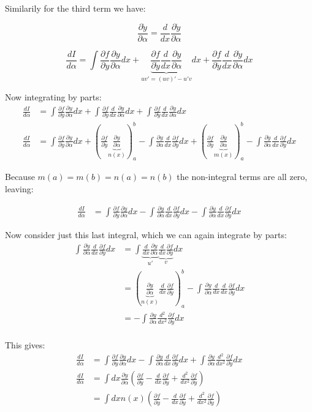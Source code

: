 \documentclass{article}      %
\newcommand{\ydot}[0]{\dot{y}}
\newcommand{\yddot}[0]{\ddot{y}}
\newcommand{\PD}[2]{\frac{\partial {#2}}{\partial {#1}}}
\begin{document}
Similarily for the third term we have:

\begin{equation*}
\PD{\alpha}{\ydot} = \frac{d}{ d x} \PD{\alpha}{\ydot}
\end{equation*}

\begin{equation*}
\frac{dI}{d\alpha} = 
\int \PD{y}{f} \PD{\alpha}{y} d x +
\underbrace{\PD{\ydot}{f} \frac{d}{ d x} \PD{\alpha}{y}}_{ u v' = (u v)' - u' v } d x
+\PD{\yddot}{f} \frac{d}{ d x} \PD{\alpha}{\ydot} d x
\end{equation*}

Now integrating by parts:
\begin{align*}
\frac{dI}{d\alpha} &= 
 \int \PD{y}{f} \PD{\alpha}{y} d x
+\int \PD{\ydot}{f} \frac{d}{ d x} \PD{\alpha}{y} d x
+\int \PD{\yddot}{f} \frac{d}{ d x} \PD{\alpha}{\ydot} d x \\
\frac{dI}{d\alpha} &= 
 \int \PD{y}{f} \PD{\alpha}{y} d x
+\left(\PD{\ydot}{f} \underbrace{\PD{\alpha}{y}}_{n(x)}\right)_a^b - \int \PD{\alpha}{y} \frac{d}{ d x} \PD{\ydot}{f} d x
+\left(\PD{\yddot}{f} \underbrace{\PD{\alpha}{\ydot}}_{m(x)} \right)_a^b
-\int \PD{\alpha}{\ydot} \frac{d}{ d x} \PD{\yddot}{f} d x
\end{align*}

Because $m(a) = m(b) = n(a) = n(b)$ the non-integral terms are all zero, leaving:

\begin{align*}
\frac{dI}{d\alpha} &= 
  \int \PD{y}{f} \PD{\alpha}{y} d x
- \int \PD{\alpha}{y} \frac{d}{ d x} \PD{\ydot}{f} d x
- \int \PD{\alpha}{\ydot} \frac{d}{ d x} \PD{\yddot}{f} d x
\end{align*}

Now consider just this last integral, which we can again integrate by parts:
\begin{align*}
\int \PD{\alpha}{\ydot} \frac{d}{ d x} \PD{\yddot}{f} d x
&= \int \underbrace{\frac{d}{dx} \PD{\alpha}{y}}_{u'} \underbrace{\frac{d}{ d x} \PD{\yddot}{f}}_{v} d x \\
&= 
\left( \underbrace{\PD{\alpha}{y}}_{n(x)} {\frac{d}{ d x} \PD{\yddot}{f}} \right)_a^b
-\int \PD{\alpha}{y} \frac{d}{dx} {\frac{d}{ d x} \PD{\yddot}{f}} d x \\
&= 
-\int \PD{\alpha}{y} \frac{d^2}{dx^2} \PD{\yddot}{f} d x \\
\end{align*}

This gives:
\begin{align*}
\frac{dI}{d\alpha} &= 
  \int \PD{y}{f} \PD{\alpha}{y} d x
- \int \PD{\alpha}{y} \frac{d}{ d x} \PD{\ydot}{f} d x
+ \int \PD{\alpha}{y} \frac{d^2}{dx^2} \PD{\yddot}{f} d x \\
\frac{dI}{d\alpha} 
&= \int d x \PD{\alpha}{y} \left( \PD{y}{f} - \frac{d}{ d x} \PD{\ydot}{f} + \frac{d^2}{dx^2} \PD{\yddot}{f} \right) \\
&= \int d x n(x) \left( \PD{y}{f} - \frac{d}{ d x} \PD{\ydot}{f} + \frac{d^2}{dx^2} \PD{\yddot}{f} \right)
\end{align*}
\end{document}
